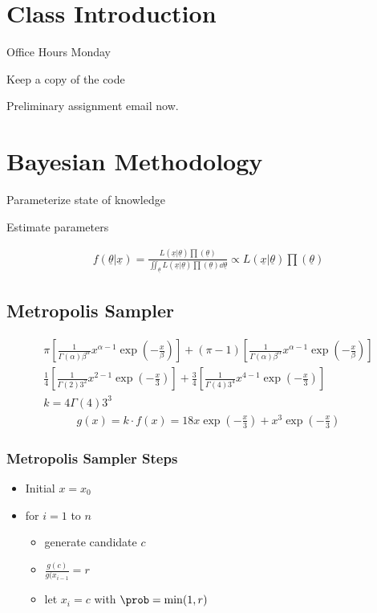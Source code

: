 \documentclass[12pt,letterpaper,oneside]{article}\usepackage{graphicx, color}
\newcommand{\dateTaken}{January 7, 2013}
\begin{document}

\tableofcontents
\renewcommand{\dateTaken}{January 8, 2013}
\daysep

\section{Class Introduction} %
\label{sec:class_introduction}
Office Hours Monday

Keep a copy of the code

Preliminary assignment email now.

\section{Bayesian Methodology} %
\label{sec:bayesian_methodology}
Parameterize state of knowledge

Estimate parameters

\begin{align*}
    f(\underline{\theta}|\underline{x})=\frac{L(\underline{x}|\underline{\theta})\prod(\underline{\theta})}{\iint_{\underline{\theta}} L(\underline{x}|\underline{\theta})\prod(\underline{\theta}) \dd \underline{\theta}} \propto L(\underline{x}| \underline{\theta})\prod(\underline{\theta})
\end{align*}
\subsection{Metropolis Sampler} %
\label{sub:metropolis_sampler}

\begin{align*}
    \pi\left[\frac{1}{\Gamma(\alpha)\beta^{\alpha}}x^{\alpha-1} \exp\left( -\frac{x}{\beta}\right)\right]+ (\pi-1)\left[\frac{1}{\Gamma(\alpha)\beta^{\alpha}}x^{\alpha-1} \exp\left( -\frac{x}{\beta}\right)\right]\\
    \frac{1}{4}\left[\frac{1}{\Gamma(2)3^{2}}x^{2-1} \exp\left( -\frac{x}{3}\right)\right] +
    \frac{3}{4}\left[\frac{1}{\Gamma(4)3^{4}}x^{4-1} \exp\left( -\frac{x}{3}\right)\right]\\
    k=4\Gamma(4) 3^3
\end{align*}
\begin{align*}
    g(x)=k \cdot f(x)= 18 x \exp\left(-\frac{x}{3}\right)+ x^3\exp\left(-\frac{x}{3}\right)
\end{align*}
\subsubsection{Metropolis Sampler Steps} %
\label{ssub:metropolis_sampler_steps}
\begin{itemize}
    \item Initial $x=x_0$
    \item for $i=1$ to $n$
    \begin{itemize}
        \item generate candidate $c$
        \item $\displaystyle{\frac{g(c)}{g(x_{i-1}} = r}$
        \item let $x_i=c$ with $\prob=\min(1,r)$
    \end{itemize}
\end{itemize}
\end{document}
